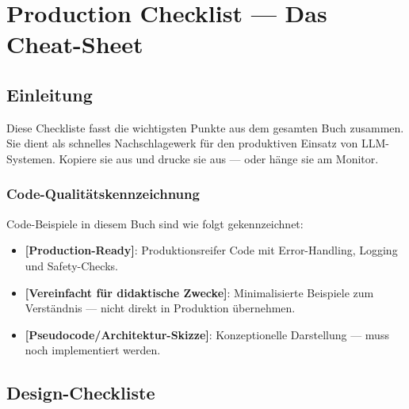 \chapter{Production Checklist --- Das Cheat-Sheet}
\label{appendix:checklist}

\section{Einleitung}

Diese Checkliste fasst die wichtigsten Punkte aus dem gesamten Buch zusammen. Sie dient als schnelles Nachschlagewerk für den produktiven Einsatz von LLM-Systemen. Kopiere sie aus und drucke sie aus --- oder hänge sie am Monitor.

\subsection{Code-Qualitätskennzeichnung}

Code-Beispiele in diesem Buch sind wie folgt gekennzeichnet:

\begin{itemize}[leftmargin=*]
     \item \textbf{[Production-Ready]}\hspace{0pt}: Produktionsreifer Code mit Error-Handling, Logging und Safety-Checks.
     \item \textbf{[Vereinfacht für didaktische Zwecke]}\hspace{0pt}: Minimalisierte Beispiele zum Verständnis --- nicht direkt in Produktion übernehmen.
     \item \textbf{[Pseudocode/Architektur-Skizze]}\hspace{0pt}: Konzeptionelle Darstellung --- muss noch implementiert werden.
\end{itemize}

\section{Design-Checkliste}

